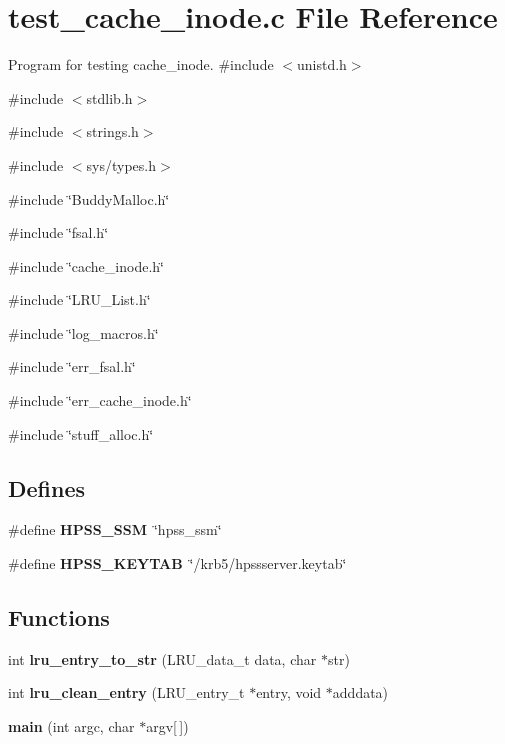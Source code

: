 \section{test\_\-cache\_\-inode.c File Reference}
\label{test__cache__inode_8c}


Program for testing cache\_\-inode.  
{\ttfamily \#include $<$unistd.h$>$}\par
{\ttfamily \#include $<$stdlib.h$>$}\par
{\ttfamily \#include $<$strings.h$>$}\par
{\ttfamily \#include $<$sys/types.h$>$}\par
{\ttfamily \#include \char`\"{}BuddyMalloc.h\char`\"{}}\par
{\ttfamily \#include \char`\"{}fsal.h\char`\"{}}\par
{\ttfamily \#include \char`\"{}cache\_\-inode.h\char`\"{}}\par
{\ttfamily \#include \char`\"{}LRU\_\-List.h\char`\"{}}\par
{\ttfamily \#include \char`\"{}log\_\-macros.h\char`\"{}}\par
{\ttfamily \#include \char`\"{}err\_\-fsal.h\char`\"{}}\par
{\ttfamily \#include \char`\"{}err\_\-cache\_\-inode.h\char`\"{}}\par
{\ttfamily \#include \char`\"{}stuff\_\-alloc.h\char`\"{}}\par
\subsection*{Defines}
\begin{DoxyCompactItemize}
\item 
\#define {\bf HPSS\_\-SSM}~\char`\"{}hpss\_\-ssm\char`\"{}
\item 
\#define {\bf HPSS\_\-KEYTAB}~\char`\"{}/krb5/hpssserver.keytab\char`\"{}
\end{DoxyCompactItemize}
\subsection*{Functions}
\begin{DoxyCompactItemize}
\item 
int {\bf lru\_\-entry\_\-to\_\-str} (LRU\_\-data\_\-t data, char $\ast$str)
\item 
int {\bf lru\_\-clean\_\-entry} (LRU\_\-entry\_\-t $\ast$entry, void $\ast$adddata)
\item 
{\bf main} (int argc, char $\ast$argv[$\,$])
\end{DoxyCompactItemize}


